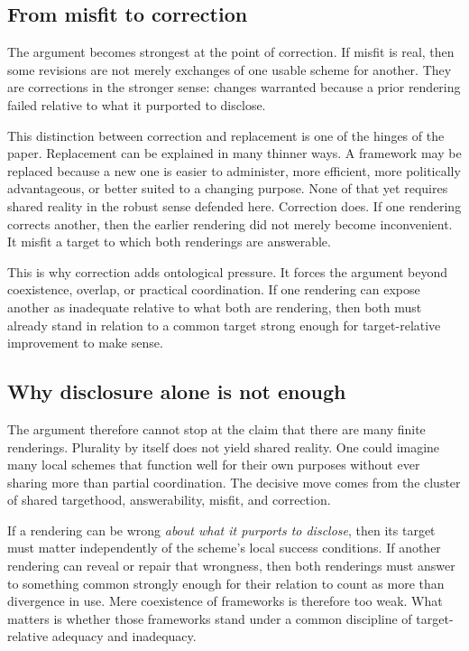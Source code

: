 \documentclass[11pt]{article}
\renewcommand{\emph}[1]{\textit{#1}}
\begin{document}
\subsection{From misfit to correction}

The argument becomes strongest at the point of correction. If misfit is real, then some revisions are not merely exchanges of one usable scheme for another. They are corrections in the stronger sense: changes warranted because a prior rendering failed relative to what it purported to disclose.

This distinction between correction and replacement is one of the hinges of the paper. Replacement can be explained in many thinner ways. A framework may be replaced because a new one is easier to administer, more efficient, more politically advantageous, or better suited to a changing purpose. None of that yet requires shared reality in the robust sense defended here. Correction does. If one rendering corrects another, then the earlier rendering did not merely become inconvenient. It misfit a target to which both renderings are answerable.

This is why correction adds ontological pressure. It forces the argument beyond coexistence, overlap, or practical coordination. If one rendering can expose another as inadequate relative to what both are rendering, then both must already stand in relation to a common target strong enough for target-relative improvement to make sense.

\subsection{Why disclosure alone is not enough}

The argument therefore cannot stop at the claim that there are many finite renderings. Plurality by itself does not yield shared reality. One could imagine many local schemes that function well for their own purposes without ever sharing more than partial coordination. The decisive move comes from the cluster of shared targethood, answerability, misfit, and correction.

If a rendering can be wrong \emph{about what it purports to disclose}, then its target must matter independently of the scheme's local success conditions. If another rendering can reveal or repair that wrongness, then both renderings must answer to something common strongly enough for their relation to count as more than divergence in use. Mere coexistence of frameworks is therefore too weak. What matters is whether those frameworks stand under a common discipline of target-relative adequacy and inadequacy.
\end{document}
